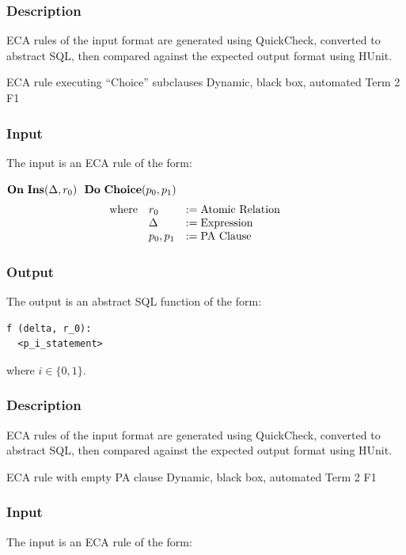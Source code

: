 \documentclass[12pt]{report}
\begin{document}
\vspace{-12pt}\subsubsection*{Description}

ECA rules of the input format are generated using QuickCheck, converted to
  abstract SQL, then compared against the expected output format using HUnit.

{ECA rule executing ``Choice'' subclauses}  %
{Dynamic, black box, automated}  
{Term 2}
{F1}
\vspace{-12pt}\subsubsection*{Input}
The input is an ECA rule of the form:

$\mathbf{On~} \mathbf{Ins}(\Delta,r_0) \,\,\,\,\mathbf{Do~} \mathbf{Choice} ( p_0, p_1 )$
\vspace{-10pt}\[\hspace{-20pt}\begin{array}{lll}
\text{where} & r_0   & := \text{Atomic Relation} \\ 
             & \Delta & := \text{Expression} \\ 
             & p_0, p_1 & := \text{PA Clause} \\
\end{array}\]

\vspace{-12pt}\subsubsection*{Output}

The output is an abstract SQL function of the form:
\begin{verbatim}
f (delta, r_0):
  <p_i_statement>
\end{verbatim}
where $i \in \{ 0, 1 \}$. 

\vspace{-12pt}\subsubsection*{Description}

ECA rules of the input format are generated using QuickCheck, converted to
  abstract SQL, then compared against the expected output format using HUnit.

{ECA rule with empty PA clause} 
{Dynamic, black box, automated}  
{Term 2}
{F1}
\vspace{-12pt}\subsubsection*{Input}
The input is an ECA rule of the form:
\end{document}
